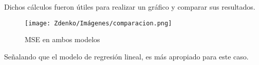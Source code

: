 Dichos cálculos fueron útiles para realizar un gráfico y comparar sus resultados.
\begin{figure}[H] \centering \texttt{[image: Zdenko/Imágenes/comparacion.png]} \caption{MSE en ambos modelos} \label{fig:comparacion} \end{figure}

Señalando que el modelo de regresión lineal, es más apropiado para este caso. 